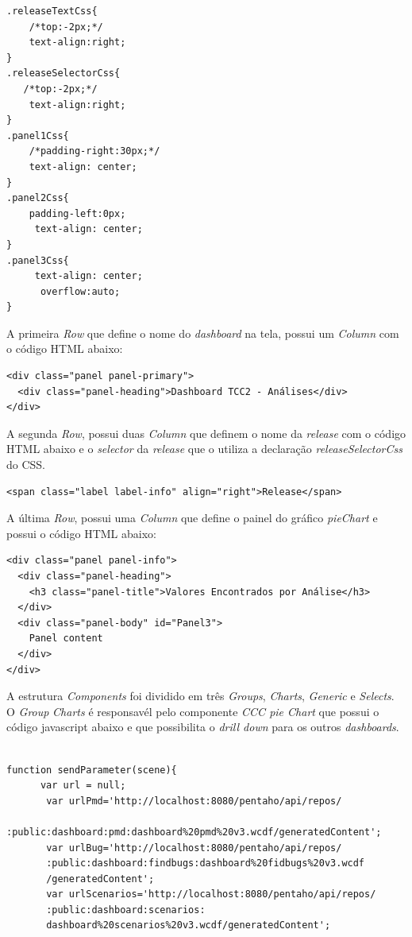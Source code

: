 \begin{apendicesenv}
\begin{verbatim}
.releaseTextCss{
    /*top:-2px;*/  
    text-align:right;
} 
.releaseSelectorCss{
   /*top:-2px;*/  
    text-align:right;
}
.panel1Css{
    /*padding-right:30px;*/
    text-align: center;  
}
.panel2Css{
    padding-left:0px;
     text-align: center;  
}
.panel3Css{
     text-align: center;  
      overflow:auto; 
}

\end{verbatim}






A primeira \textit{Row} que define o nome do \textit{dashboard} na tela, possui um \textit{Column} com o código HTML abaixo:

\begin{verbatim}
<div class="panel panel-primary">
  <div class="panel-heading">Dashboard TCC2 - Análises</div>
</div> 
\end{verbatim} 


A segunda \textit{Row}, possui duas \textit{Column} que definem o nome da \textit{release} com o código HTML abaixo e o \textit{selector} da \textit{release} que o utiliza a declaração \textit{releaseSelectorCss} do CSS.

\begin{verbatim}
<span class="label label-info" align="right">Release</span> 
\end{verbatim}

A última \textit{Row}, possui uma \textit{Column} que define o painel do gráfico \textit{pieChart} e possui o código HTML abaixo:

\begin{verbatim}
<div class="panel panel-info">
  <div class="panel-heading">
    <h3 class="panel-title">Valores Encontrados por Análise</h3>
  </div>
  <div class="panel-body" id="Panel3">
    Panel content
  </div>
</div> 
\end{verbatim}

A estrutura \textit{Components} foi dividido em três \textit{Groups}, \textit{Charts}, \textit{Generic} e \textit{Selects}. O \textit{Group} \textit{Charts} é responsavél pelo componente \textit{CCC pie Chart} que possui o código javascript abaixo e que possibilita o \textit{drill down} para os outros \textit{dashboards}.

\begin{verbatim}

function sendParameter(scene){
      var url = null;
       var urlPmd='http://localhost:8080/pentaho/api/repos/
       :public:dashboard:pmd:dashboard%20pmd%20v3.wcdf/generatedContent';
       var urlBug='http://localhost:8080/pentaho/api/repos/
       :public:dashboard:findbugs:dashboard%20fidbugs%20v3.wcdf
       /generatedContent';
       var urlScenarios='http://localhost:8080/pentaho/api/repos/
       :public:dashboard:scenarios:
       dashboard%20scenarios%20v3.wcdf/generatedContent';
       

\end{verbatim}
\end{apendicesenv}
